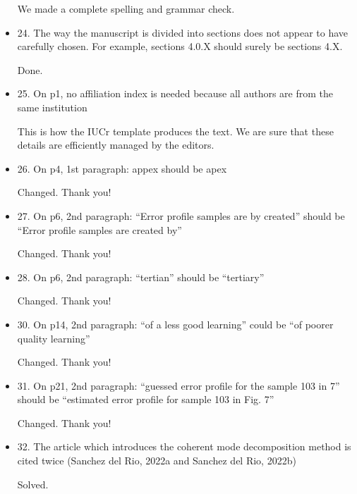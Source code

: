 \documentclass[11pt]{letter} %
\newcommand{\inred}[1]{{\color{red}#1}}
\begin{document}
\begin{letter}{}
\begin{itemize}
    \inred{We made a complete spelling and grammar check.}
    
    \item 24. The way the manuscript is divided into sections does not appear to have carefully chosen. For example, sections 4.0.X should surely be sections 4.X.
    
    \inred{Done.}
    
    \item 25. On p1, no affiliation index is needed because all authors are from the same institution
    
    \inred{This is how the IUCr template produces the text. We are sure that these details are efficiently managed by the editors.}
    
    \item 26. On p4, 1st paragraph: appex should be apex
    
    \inred{Changed. Thank you!}
    
    \item 27. On p6, 2nd paragraph: “Error profile samples are by created” should be “Error profile samples are created by”
    
    \inred{Changed. Thank you!}
    
    \item 28. On p6, 2nd paragraph: “tertian” should be “tertiary”
    
    \inred{Changed. Thank you!}
    
    \item 30. On p14, 2nd paragraph: “of a less good learning” could be “of poorer quality learning”
    
    \inred{Changed. Thank you!}
    
    \item 31. On p21, 2nd paragraph: “guessed error profile for the sample 103 in 7” should be “estimated error profile for sample 103 in Fig. 7”
    
    \inred{Changed. Thank you!}
    
    \item 32. The article which introduces the coherent mode decomposition method is cited twice (Sanchez del Rio, 2022a and Sanchez del Rio, 2022b)
    
    \inred{Solved.}
    
\end{itemize}

\end{letter}
 
\end{document}
